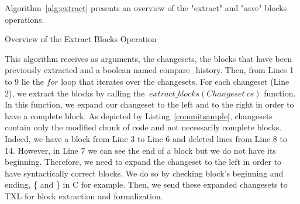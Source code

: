 \documentclass[conference]{IEEEtran}
\begin{document}
Algorithm~\ref{alg:extract} presents an overview of the "extract" and "save" blocks operations.

\begin{algorithm}[H]


 \caption{Overview of the Extract Blocks Operation\label{alg:extract}}
\end{algorithm}

This algorithm receives as arguments, the changesets, the blocks that have been previously extracted and a boolean named compare\_history.
Then, from Lines 1 to 9 lie the $for$ loop that iterates over the changesets. For each changeset (Line 2), we extract the blocks by calling the $~extract\_blocks(Changeset~cs)$ function.
In this function, we expand our changeset to the left and to the right in order to have a complete block.
As depicted by Listing~\ref{commitsample}, changesets contain only the modified chunk of code and not necessarily complete blocks. Indeed, we have a block from Line 3 to Line 6 and deleted lines from Line 8 to 14.
However, in Line 7 we can see the end of a block but we do not have its beginning. Therefore, we need to expand the changeset to the left in order to have syntactically correct blocks.
We do so by checking block's beginning and ending, \{ and \} in C for example.
Then, we send these expanded changesets to TXL for block extraction and formalization.

\noindent\begin{minipage}{0.90\linewidth}

  

\end{minipage}
\end{document}
